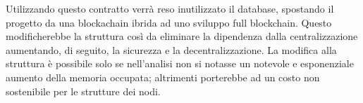 \documentclass[11pt,a4paper,titlepage]{report}
\begin{document}
Utilizzando questo contratto verrà reso inutilizzato il database, spostando il progetto da una blockachain ibrida ad uno sviluppo full blockchain. Questo modificherebbe la struttura così da eliminare la dipendenza dalla centralizzazione aumentando, di seguito, la sicurezza e la decentralizzazione. La modifica alla struttura è possibile solo se nell'analisi non si notasse un notevole e esponenziale aumento della memoria occupata; altrimenti porterebbe ad un costo non sostenibile per le strutture dei nodi.

\listoffigures
\end{document}
